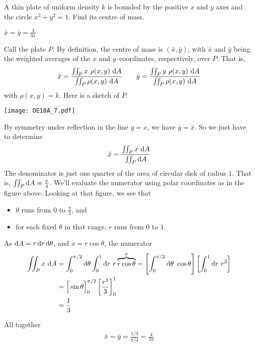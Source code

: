 \begin{question}[M200 2010A] %
A thin plate of uniform density $k$ is bounded by the positive $x$ and $y$ 
axes and the circle $x^2 + y^2 = 1$. Find its centre of mass.
\end{question}

%

\begin{answer}
$\bar x = \bar y =\frac{4}{3\pi}$
\end{answer}

\begin{solution}
 Call the plate $P$. 
By definition, the centre of mass is $(\bar x, \bar y)$,
with $\bar x$ and $\bar y$ being the weighted averages  of the $x$ and 
$y$--coordinates, respectively, over $P$. That is,
\begin{align*}
\bar x = \frac{\dblInt_P x\ \rho(x,y)\ \dee{A}}{\dblInt_P \rho(x,y)\ \dee{A}}
\qquad
\bar y = \frac{\dblInt_P y\ \rho(x,y)\ \dee{A}}{\dblInt_P \rho(x,y)\ \dee{A}}
\end{align*}
with $\rho(x,y)=k$.
Here is a sketch of $P$.
\begin{center}
     \texttt{[image: OE10A\_7.pdf]}
\end{center}
By symmetry under reflection in the line $y=x$, we have $\bar y=\bar x$.
So we just have to determine 
\begin{equation*}
\bar x = \frac{\iint_P x\ \mathrm{d}A}{\iint_P  \mathrm{d}A}
\end{equation*}
The denominator is just one quarter of the area of circular disk of radius $1$.
That is, $\iint_P  \mathrm{d}A=\frac{\pi}{4}$.
We'll evaluate the numerator using polar coordinates as in the figure above.
Looking at that figure, we see that
\begin{itemize}
\item 
$\theta$ runs from $0$ to $\frac{\pi}{2}$, and
\item
for each fixed $\theta$ in that range, $r$ runs from $0$ to $1$.
\end{itemize}
As $\mathrm{d}A=r\,\mathrm{d}r\,\mathrm{d}\theta$, and $x=r\cos\theta$, the numerator
\begin{align*}
\dblInt_P x\ \dee{A}
&=\int_0^{\pi/2}\dee{\theta} \int_0^1\dee{r}\ r\overbrace{r\cos\theta}^{x}
=\left[\int_0^{\pi/2}\dee{\theta}\ \cos\theta\right]
 \left[ \int_0^1\dee{r}\ r^2\right] \\
&=\Big[\sin\theta\Big]_0^{\pi/2} \left[\frac{r^3}{3}\right]_0^1 \\
&=\frac{1}{3}
\end{align*}

All together
\begin{align*}
\bar x = \bar y = \frac{1/3}{\pi/4} =\frac{4}{3\pi}
\end{align*}
\end{solution}

